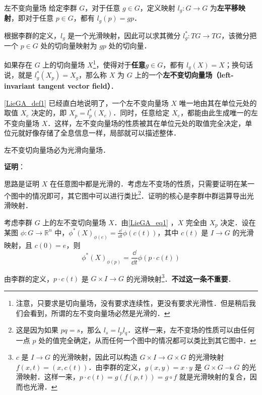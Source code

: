 \begin{definition}{左不变向量场}\label{LieGA_def1}
给定李群 $G$，对于任意 $g\in G$，定义映射 $l_g:G\to G$ 为\textbf{左平移映射}，即对于任意 $p\in G$，都有 $l_g(p)=gp$．

根据李群的定义，$l_g$ 是一个光滑映射，因此可以求其微分 $l_{g}^*:TG\to TG$，该微分把一个 $p\in G$ 处的切向量映射为 $gp$ 处的切向量．

如果存在 $G$ 上的切向量场 $X$\footnote{注意，只要求是切向量场，没有要求连续性，更没有要求光滑性．但是稍后我们会看到，所谓的左不变向量场必然是光滑的．}，使得对于\textbf{任意}$g\in G$，都有 $l_g(X)=X$；换句话说，就是 $l_{g}^*(X_p)=X_g$，那么称 $X$ 为 $G$ 上的一个\textbf{左不变切向量场（left-invariant tangent vector field）}．
\end{definition}

\autoref{LieGA_def1} 已经直白地说明了，一个左不变向量场 $X$ 唯一地由其在单位元处的取值 $X_e$ 决定的，即 $X_p=l_{p}^*(X_e)$．同时，任意给定 $X_e$，都能由此生成唯一的左不变向量场 $X$．这样，左不变向量场的性质被其在单位元处的取值完全决定，单位元就好像存储了全息信息一样，局部就可以描述整体．

\begin{theorem}{}
左不变切向量场必为光滑向量场．
\end{theorem}

\textbf{证明}：




思路是证明 $X$ 在任意图中都是光滑的．考虑左不变场的性质，只需要证明在某一个图中的情况即可，其它图中可以进行类比\footnote{这是因为如果 $pq=s$，那么 $l_{s}=l_pl_q$．这样一来，左不变场的性质可以由任何一点 $p$ 处的值完全确定，从而任何一个图中的情况都可以类比到其它图中．}．证明的核心是李群中群运算导出光滑映射．

考虑李群 $G$ 上的左不变切向量场 $X$．由\autoref{LieGA_eq1} ，$X$ 完全由 $X_p$ 决定．设在某图 $\phi: G\to\mathbb{R}^n$ 中，$\phi^*(X)_{\phi(e)}=\frac{\dd }{\dd t}\phi(c(t))$，其中 $c(t)$ 是 $I\to G$ 的光滑映射，且 $c(0)=e$，则
\begin{equation}\label{LieGA_eq2}
\phi^*(X)_{\phi(p)}=\frac{\dd}{\dd t}\phi(p\cdot c(t))
\end{equation}

由李群的定义，$p\cdot c(t)$ 是 $G\times I\to G$ 的光滑映射\footnote{$c$ 是 $I\to G$ 的光滑映射，因此可以构造 $G\times I\to G\times G$ 的光滑映射 $f(x, t)=(x, c(t))$．由李群的定义，$g(x, y)=x\cdot y$ 是 $G\times G\to G$ 的光滑映射．这样一来，$p\cdot c(t)=g(f(p, t))=g\circ f$ 就是光滑映射的复合，因而也光滑．}．\textbf{不过这一条不重要}．

